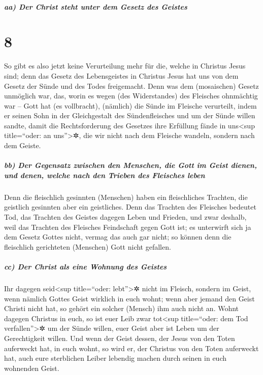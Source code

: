 \hypertarget{aa-der-christ-steht-unter-dem-gesetz-des-geistes}{%
\subparagraph{aa) Der Christ steht unter dem Gesetz des
Geistes}\label{aa-der-christ-steht-unter-dem-gesetz-des-geistes}}

\hypertarget{section-7}{%
\section{8}\label{section-7}}

 So gibt es also jetzt keine Verurteilung mehr für die,
welche in Christus Jesus sind;  denn das Gesetz des
Lebensgeistes in Christus Jesus hat uns von dem Gesetz der Sünde und des
Todes freigemacht.  Denn was dem (mosaischen) Gesetz
unmöglich war, das, worin es wegen (des Widerstandes) des Fleisches
ohnmächtig war -- Gott hat (es vollbracht), (nämlich) die Sünde im
Fleische verurteilt, indem er seinen Sohn in der Gleichgestalt des
Sündenfleisches und um der Sünde willen sandte,  damit die
Rechtsforderung des Gesetzes ihre Erfüllung fände in uns\textless sup
title=``oder: an uns''\textgreater✲, die wir nicht nach dem Fleische
wandeln, sondern nach dem Geiste.

\hypertarget{bb-der-gegensatz-zwischen-den-menschen-die-gott-im-geist-dienen-und-denen-welche-nach-den-trieben-des-fleisches-leben}{%
\subparagraph{bb) Der Gegensatz zwischen den Menschen, die Gott im Geist
dienen, und denen, welche nach den Trieben des Fleisches
leben}\label{bb-der-gegensatz-zwischen-den-menschen-die-gott-im-geist-dienen-und-denen-welche-nach-den-trieben-des-fleisches-leben}}

 Denn die fleischlich gesinnten (Menschen) haben ein
fleischliches Trachten, die geistlich gesinnten aber ein geistliches.
 Denn das Trachten des Fleisches bedeutet Tod, das
Trachten des Geistes dagegen Leben und Frieden,  und zwar
deshalb, weil das Trachten des Fleisches Feindschaft gegen Gott ist; es
unterwirft sich ja dem Gesetz Gottes nicht, vermag das auch gar nicht;
 so können denn die fleischlich gerichteten (Menschen)
Gott nicht gefallen.

\hypertarget{cc-der-christ-als-eine-wohnung-des-geistes}{%
\subparagraph{cc) Der Christ als eine Wohnung des
Geistes}\label{cc-der-christ-als-eine-wohnung-des-geistes}}

 Ihr dagegen seid\textless sup title=``oder:
lebt''\textgreater✲ nicht im Fleisch, sondern im Geist, wenn nämlich
Gottes Geist wirklich in euch wohnt; wenn aber jemand den Geist Christi
nicht hat, so gehört ein solcher (Mensch) ihm auch nicht an.
 Wohnt dagegen Christus in euch, so ist euer Leib zwar
tot\textless sup title=``oder: dem Tod verfallen''\textgreater✲ um der
Sünde willen, euer Geist aber ist Leben um der Gerechtigkeit willen.
 Und wenn der Geist dessen, der Jesus von den Toten
auferweckt hat, in euch wohnt, so wird er, der Christus von den Toten
auferweckt hat, auch eure sterblichen Leiber lebendig machen durch
seinen in euch wohnenden Geist.

